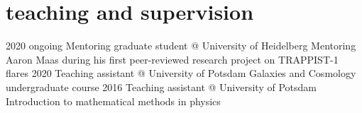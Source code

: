 \documentclass[11pt]{k-cv} %
\begin{document}


\section{teaching and supervision}

\begin{entrylist}


\entry
{2020 \to ongoing}
{Mentoring graduate student @ University of Heidelberg}
{}
{Mentoring Aaron Maas during his first peer-reviewed research project on TRAPPIST-1 flares}
\entry
{2020}
{Teaching assistant @ University of Potsdam }
{}
{Galaxies and Cosmology undergraduate course}
\entry
{2016 }
{Teaching assistant @ University of Potsdam }
{}
{Introduction to mathematical methods in physics}
\end{entrylist}



\end{document}

